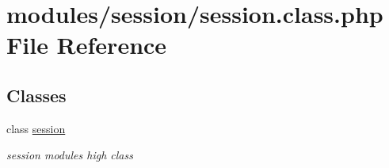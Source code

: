 \hypertarget{session_8class_8php}{}\section{modules/session/session.class.\+php File Reference}
\label{session_8class_8php}
\subsection*{Classes}
\begin{DoxyCompactItemize}
\item 
class \hyperlink{classsession}{session}
\begin{DoxyCompactList}\small\item\em session module\textquotesingle{}s high class \end{DoxyCompactList}\end{DoxyCompactItemize}
